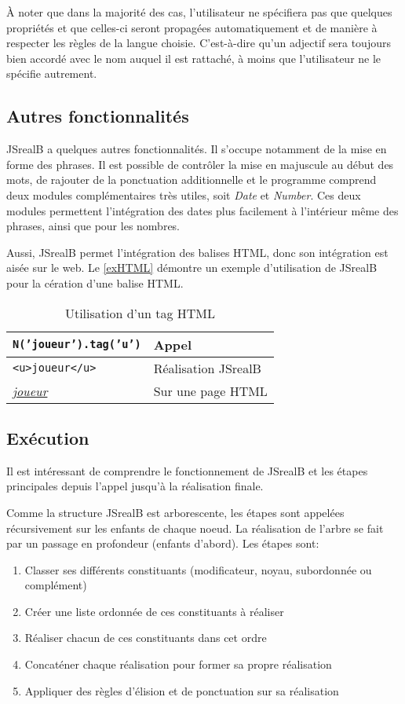 \documentclass[11pt]{article} %
\newcommand{\system}[1]{\textsf{#1}}
\newcommand{\JSB}{\system{JSrealB}}
\newcommand{\real}[1]{\emph{#1}}
\begin{document}
À noter que dans la majorité des cas, l'utilisateur ne spécifiera pas
que quelques propriétés et que celles-ci seront propagées automatiquement
et de manière à respecter les règles de la langue choisie. C'est-à-dire qu'un
adjectif sera toujours bien accordé avec le nom auquel il est rattaché, à moins
que l'utilisateur ne le spécifie autrement.

\subsection{Autres fonctionnalités}

\JSB{} a quelques autres fonctionnalités. Il s'occupe notamment de
la mise en forme des phrases. Il est possible de contrôler la mise
en majuscule au début des mots, de rajouter de la ponctuation additionnelle
et le programme comprend deux modules complémentaires très utiles,
soit \emph{Date} et \emph{Number}. Ces deux modules permettent l'intégration
des dates plus facilement à l'intérieur même des phrases, ainsi que
pour les nombres. 

Aussi, \JSB{} permet l'intégration des balises HTML, donc son intégration
est aisée sur le web. Le \autoref{exHTML} démontre un exemple d'utilisation
de \JSB{} pour la cération d'une balise HTML. \\
\begin{table}[ht]
\centering
\caption{Utilisation d'un tag HTML}
\begin{tabular}{|p{3.8cm} | l |}
\hline
\texttt{N('joueur').tag('u')}  &  \textnormal{Appel} \\
\hline    
\texttt{<u>joueur</u>}        &   \textnormal{Réalisation \JSB{}} \\
\hline
\real{\underline{joueur}} & Sur une page HTML \\
\hline
\end{tabular}
\label{exHTML}
\end{table}

\subsection{Exécution}
\label{subsec:exec}

Il est intéressant de comprendre le fonctionnement de \JSB{} et
 les étapes principales depuis l'appel jusqu'à la réalisation finale.

Comme la structure \JSB{} est arborescente, les
étapes sont appelées récursivement sur les
enfants de chaque noeud. La réalisation de l'arbre se fait par un
passage en profondeur (enfants d'abord). Les étapes sont:
\begin{enumerate}
\item Classer ses différents constituants (modificateur, noyau, subordonnée
ou complément)
\item Créer une liste ordonnée de ces constituants à réaliser
\item Réaliser chacun de ces constituants dans cet ordre 
\item Concaténer chaque réalisation pour former sa propre réalisation
\item Appliquer des règles d'élision et de ponctuation sur sa réalisation
\end{enumerate}
\end{document}
